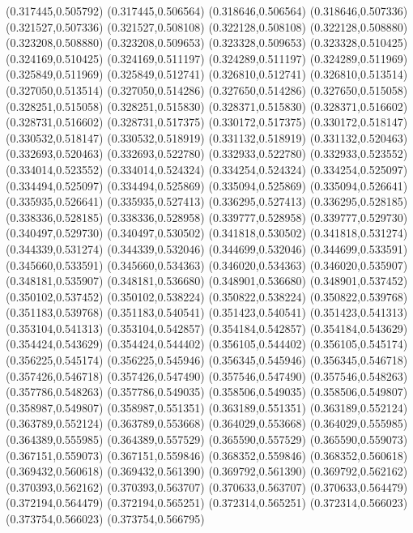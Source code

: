 (0.317445,0.505792)
(0.317445,0.506564)
(0.318646,0.506564)
(0.318646,0.507336)
(0.321527,0.507336)
(0.321527,0.508108)
(0.322128,0.508108)
(0.322128,0.508880)
(0.323208,0.508880)
(0.323208,0.509653)
(0.323328,0.509653)
(0.323328,0.510425)
(0.324169,0.510425)
(0.324169,0.511197)
(0.324289,0.511197)
(0.324289,0.511969)
(0.325849,0.511969)
(0.325849,0.512741)
(0.326810,0.512741)
(0.326810,0.513514)
(0.327050,0.513514)
(0.327050,0.514286)
(0.327650,0.514286)
(0.327650,0.515058)
(0.328251,0.515058)
(0.328251,0.515830)
(0.328371,0.515830)
(0.328371,0.516602)
(0.328731,0.516602)
(0.328731,0.517375)
(0.330172,0.517375)
(0.330172,0.518147)
(0.330532,0.518147)
(0.330532,0.518919)
(0.331132,0.518919)
(0.331132,0.520463)
(0.332693,0.520463)
(0.332693,0.522780)
(0.332933,0.522780)
(0.332933,0.523552)
(0.334014,0.523552)
(0.334014,0.524324)
(0.334254,0.524324)
(0.334254,0.525097)
(0.334494,0.525097)
(0.334494,0.525869)
(0.335094,0.525869)
(0.335094,0.526641)
(0.335935,0.526641)
(0.335935,0.527413)
(0.336295,0.527413)
(0.336295,0.528185)
(0.338336,0.528185)
(0.338336,0.528958)
(0.339777,0.528958)
(0.339777,0.529730)
(0.340497,0.529730)
(0.340497,0.530502)
(0.341818,0.530502)
(0.341818,0.531274)
(0.344339,0.531274)
(0.344339,0.532046)
(0.344699,0.532046)
(0.344699,0.533591)
(0.345660,0.533591)
(0.345660,0.534363)
(0.346020,0.534363)
(0.346020,0.535907)
(0.348181,0.535907)
(0.348181,0.536680)
(0.348901,0.536680)
(0.348901,0.537452)
(0.350102,0.537452)
(0.350102,0.538224)
(0.350822,0.538224)
(0.350822,0.539768)
(0.351183,0.539768)
(0.351183,0.540541)
(0.351423,0.540541)
(0.351423,0.541313)
(0.353104,0.541313)
(0.353104,0.542857)
(0.354184,0.542857)
(0.354184,0.543629)
(0.354424,0.543629)
(0.354424,0.544402)
(0.356105,0.544402)
(0.356105,0.545174)
(0.356225,0.545174)
(0.356225,0.545946)
(0.356345,0.545946)
(0.356345,0.546718)
(0.357426,0.546718)
(0.357426,0.547490)
(0.357546,0.547490)
(0.357546,0.548263)
(0.357786,0.548263)
(0.357786,0.549035)
(0.358506,0.549035)
(0.358506,0.549807)
(0.358987,0.549807)
(0.358987,0.551351)
(0.363189,0.551351)
(0.363189,0.552124)
(0.363789,0.552124)
(0.363789,0.553668)
(0.364029,0.553668)
(0.364029,0.555985)
(0.364389,0.555985)
(0.364389,0.557529)
(0.365590,0.557529)
(0.365590,0.559073)
(0.367151,0.559073)
(0.367151,0.559846)
(0.368352,0.559846)
(0.368352,0.560618)
(0.369432,0.560618)
(0.369432,0.561390)
(0.369792,0.561390)
(0.369792,0.562162)
(0.370393,0.562162)
(0.370393,0.563707)
(0.370633,0.563707)
(0.370633,0.564479)
(0.372194,0.564479)
(0.372194,0.565251)
(0.372314,0.565251)
(0.372314,0.566023)
(0.373754,0.566023)
(0.373754,0.566795)
